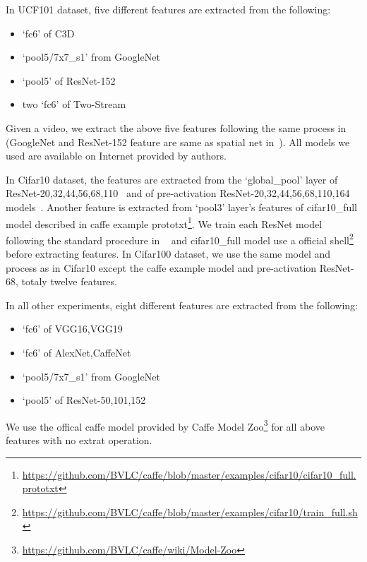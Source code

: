 \documentclass[letterpaper]{article}
\begin{document}
In UCF101 dataset, five different features are extracted from the following:
\begin{itemize}
  \item `fc6' of C3D~\cite{tran2015learning}
  \item `pool5/7x7\_s1' from GoogleNet~\cite{szegedy2015going}
  \item `pool5' of ResNet-152~\cite{he2015deep}
  \item two `fc6' of Two-Stream~\cite{simonyan2014two}
\end{itemize}

Given a video, we extract the above five features following the same process in \cite{simonyan2014two,tran2015learning}(GoogleNet and ResNet-152 feature are same as spatial net in~\cite{simonyan2014two}). All models we used are available on Internet provided by authors.

In Cifar10 dataset, the features are extracted from the `global\_pool' layer of ResNet-20,32,44,56,68,110~\cite{he2015deep} and of pre-activation ResNet-20,32,44,56,68,110,164 models~\cite{he2016identity}. Another feature is extracted from `pool3' layer's features of cifar10\_full model described in caffe example prototxt\footnote{\url{https://github.com/BVLC/caffe/blob/master/examples/cifar10/cifar10_full.prototxt}}. We train each ResNet model following the standard procedure in ~\cite{he2015deep,he2016identity} and cifar10\_full model use a official shell\footnote{\url{https://github.com/BVLC/caffe/blob/master/examples/cifar10/train_full.sh}} before extracting features. In Cifar100 dataset, we use the same model and process as in Cifar10 except the caffe example model and pre-activation ResNet-68, totaly twelve features.

In all other experiments, eight different features are extracted from the following:
\begin{itemize}
  \item `fc6' of VGG16,VGG19~\cite{chatfield2014return}
  \item `fc6' of AlexNet,CaffeNet~\cite{krizhevsky2012imagenet}
  \item `pool5/7x7\_s1' from GoogleNet~\cite{szegedy2015going}
  \item `pool5' of ResNet-50,101,152~\cite{he2015deep}
\end{itemize}
We use the offical caffe model provided by Caffe Model Zoo\footnote{\url{https://github.com/BVLC/caffe/wiki/Model-Zoo}} for all above features with no extrat operation.
\end{document}
